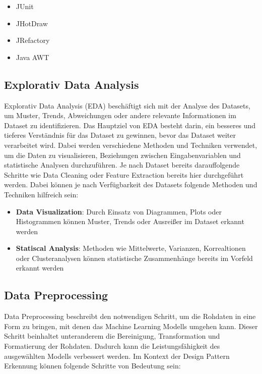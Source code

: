 \documentclass[conference]{IEEEtran}
\begin{document}
\begin{itemize}
    \item JUnit
    \item JHotDraw
    \item JRefactory
    \item Java AWT
\end{itemize}

\subsection{Explorativ Data Analysis}

Explorativ Data Analysis (EDA) beschäftigt sich mit der Analyse des Datasets, um Muster, Trends, Abweichungen oder andere relevante Informationen im Dataset zu identifizieren.
Das Hauptziel von EDA besteht darin, ein besseres und tieferes Verständnis für das Dataset zu gewinnen, bevor das Dataset weiter verarbeitet wird. Dabei werden verschiedene Methoden und Techniken verwendet,
um die Daten zu visualisieren, Beziehungen zwischen Eingabenvariablen und statistische Analysen durchzuführen. Je nach Dataset bereits darauffolgende Schritte wie Data Cleaning oder Feature Extraction bereits hier durchgeführt werden.
Dabei können je nach Verfügbarkeit des Datasets folgende Methoden und Techniken hilfreich sein:

\begin{itemize}
    \item \textbf{Data Visualization}: Durch Einsatz von Diagrammen, Plots oder Histogrammen können Muster, Trends oder Ausreißer im Dataset erkannt werden
    \item \textbf{Statiscal Analysis}: Methoden wie Mittelwerte, Varianzen, Korrealtionen oder Clusteranalysen können statistische Zusammenhänge bereits im Vorfeld erkannt werden
\end{itemize}


\subsection{Data Preprocessing}

Data Preprocessing beschreibt den notwendigen Schritt, um die Rohdaten in eine Form zu bringen, mit denen das Machine Learning Modells umgehen kann.
Dieser Schritt beinhaltet unteranderem die Bereinigung, Transformation und Formatierung der Rohdaten. Dadurch kann die Leistungsfähigkeit des ausgewählten Modells verbessert werden.
Im Kontext der Design Pattern Erkennung können folgende Schritte von Bedeutung sein:
\end{document}

